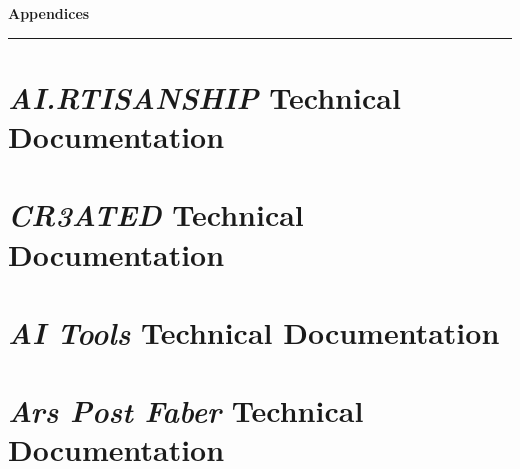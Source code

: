 \clearpage

\setcounter{chapter}{6}
\setcounter{section}{0}


\pagestyle{fancy}
\fancyhf{} %
\fancyfoot[C]{\thepage} %
\renewcommand{\headrulewidth}{0pt}
\renewcommand{\footrulewidth}{0pt}

\noindent
{\Large\textbf{Appendices}}
\vspace{0.3cm}
\hrule
\vspace{0.8cm}
\label{ch:appendices}

\setlength{\parindent}{0pt}

\section{\textit{AI.RTISANSHIP} Technical Documentation}

\section{\textit{CR3ATED} Technical Documentation}

\section{\textit{AI Tools} Technical Documentation}

\section{\textit{Ars Post Faber} Technical Documentation}
